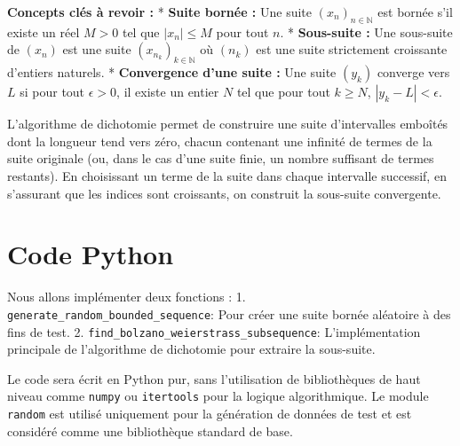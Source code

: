 \documentclass{report}
\begin{document}
\textbf{Concepts clés à revoir :}
*   \textbf{Suite bornée :} Une suite $(x_n)_{n \in \mathbb{N}}$ est bornée s'il existe un réel $M > 0$ tel que $|x_n| \le M$ pour tout $n$.
*   \textbf{Sous-suite :} Une sous-suite de $(x_n)$ est une suite $(x_{n_k})_{k \in \mathbb{N}}$ où $(n_k)$ est une suite strictement croissante d'entiers naturels.
*   \textbf{Convergence d'une suite :} Une suite $(y_k)$ converge vers $L$ si pour tout $\epsilon > 0$, il existe un entier $N$ tel que pour tout $k \ge N$, $|y_k - L| < \epsilon$.

L'algorithme de dichotomie permet de construire une suite d'intervalles emboîtés dont la longueur tend vers zéro, chacun contenant une infinité de termes de la suite originale (ou, dans le cas d'une suite finie, un nombre suffisant de termes restants). En choisissant un terme de la suite dans chaque intervalle successif, en s'assurant que les indices sont croissants, on construit la sous-suite convergente.

\section*{Code Python}

Nous allons implémenter deux fonctions :
1.  \texttt{generate\_random\_bounded\_sequence}: Pour créer une suite bornée aléatoire à des fins de test.
2.  \texttt{find\_bolzano\_weierstrass\_subsequence}: L'implémentation principale de l'algorithme de dichotomie pour extraire la sous-suite.

Le code sera écrit en Python pur, sans l'utilisation de bibliothèques de haut niveau comme \texttt{numpy} ou \texttt{itertools} pour la logique algorithmique. Le module \texttt{random} est utilisé uniquement pour la génération de données de test et est considéré comme une bibliothèque standard de base.
\end{document}
